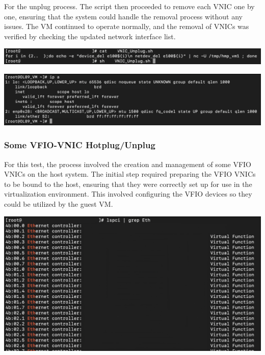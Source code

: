 For the unplug process. The script then proceeded to remove each VNIC one by one, ensuring that the system could handle the removal process without any issues. The VM continued to operate normally, and the removal of VNICs was verified by checking the updated network interface list.
\begin{center}
    \centering
    \includegraphics[width=\textwidth]{Images/24 VNIC Unplug Script.png}
    \label{fig}
\end{center}
\begin{center}
    \centering
    \includegraphics[width=\textwidth]{Images/Result of ip a.png}
    \label{fig}
\end{center}


\subsubsection[Some VFIO-VNIC Hotplug/Unplug]{Some VFIO-VNIC Hotplug/Unplug}
For this test, the process involved the creation and management of some VFIO VNICs on the host system. The initial step required preparing the VFIO VNICs to be bound to the host, ensuring that they were correctly set up for use in the virtualization environment. This involved configuring the VFIO devices so they could be utilized by the guest VM.

\begin{center}
    \centering
    \includegraphics[width=\textwidth]{Images/LSPCI Grep ETh.png}
    \label{fig}
\end{center}


